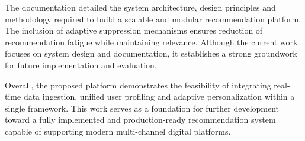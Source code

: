 \documentclass[conference]{IEEEtran}
\begin{document}
The documentation detailed the system architecture, design principles and methodology required to build a scalable and modular recommendation platform. The inclusion of adaptive suppression mechanisms ensures reduction of recommendation fatigue while maintaining relevance. Although the current work focuses on system design and documentation, it establishes a strong groundwork for future implementation and evaluation.

Overall, the proposed platform demonstrates the feasibility of integrating real-time data ingestion, unified user profiling and adaptive personalization within a single framework. This work serves as a foundation for further development toward a fully implemented and production-ready recommendation system capable of supporting modern multi-channel digital platforms.



\end{document}
